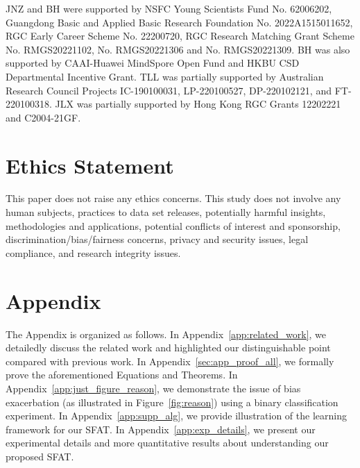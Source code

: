 \documentclass{article} %
\theoremstyle{plain}
\theoremstyle{definition}
\theoremstyle{remark}
\begin{document}
JNZ and BH were supported by NSFC Young Scientists Fund No. 62006202, Guangdong Basic and Applied Basic Research Foundation No. 2022A1515011652, RGC Early Career Scheme No. 22200720, RGC Research Matching Grant Scheme No. RMGS20221102, No. RMGS20221306 and No. RMGS20221309. BH was also supported by CAAI-Huawei MindSpore Open Fund and HKBU CSD Departmental Incentive Grant. TLL was partially supported by Australian Research Council Projects IC-190100031, LP-220100527, DP-220102121, and FT-220100318. JLX was partially supported by Hong Kong RGC Grants 12202221 and  C2004-21GF.

\section*{Ethics Statement}
This paper does not raise any ethics concerns. This study does not involve any human subjects, practices to data set releases, potentially harmful insights, methodologies and applications, potential conflicts of interest and sponsorship, discrimination/bias/fairness concerns, privacy and security issues, legal compliance, and research integrity issues.






\clearpage
\appendix
\section*{Appendix}
The Appendix is organized as follows. In Appendix~\ref{app:related_work}, we detailedly discuss the related work and highlighted our distinguishable point compared with previous work. In Appendix~\ref{sec:app_proof_all}, we formally prove the aforementioned Equations and Theorems. In Appendix~\ref{app:just_figure_reason}, we demonstrate the issue of bias exacerbation (as illustrated in Figure~\ref{fig:reason}) using a binary classification experiment. In Appendix~\ref{app:supp_alg}, we provide illustration of the learning framework for our SFAT. In Appendix~\ref{app:exp_details}, we present our experimental details and more quantitative results about understanding our proposed SFAT.

\end{document}
